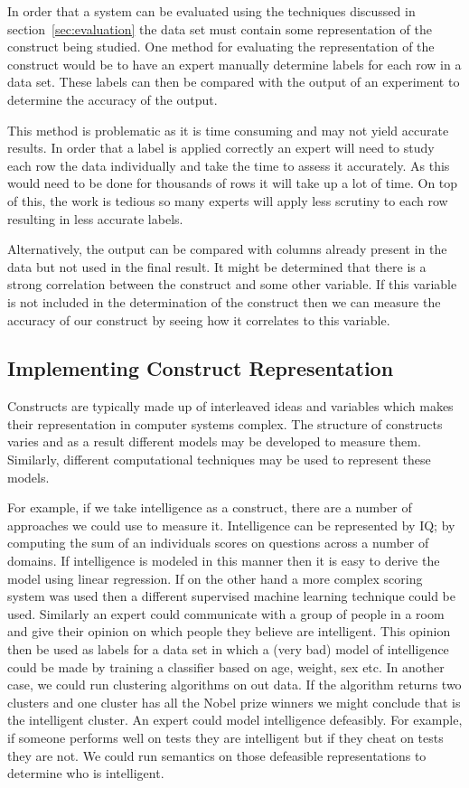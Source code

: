 In order that a system can be evaluated using the techniques discussed in  section~\ref{sec:evaluation} the data set must contain some representation of the construct being studied. One method for evaluating the representation of the construct would be to have an expert manually determine labels for each row in a data set. These labels can then be compared with the output of an experiment to determine the accuracy of the output. 

This method is problematic as it is time consuming and may not yield accurate results. In order that a label is applied correctly an expert will need to study each row the data individually and take the time to assess it accurately. As this would need to be done for thousands of rows it will take up a lot of time. On top of this, the work is tedious so many experts will apply less scrutiny to each row resulting in less accurate labels.

Alternatively, the output can be compared with columns already present in the data but not used in the final result. It might be determined that there is a strong correlation between the construct and some other variable. If this variable is not included in the determination of the construct then we can measure the accuracy of our construct by seeing how it correlates to this variable.

\subsection{Implementing Construct Representation}

Constructs are typically made up of interleaved ideas and variables which makes their representation in computer systems complex. The structure of constructs varies and as a result different models may be developed to measure them. Similarly, different computational techniques may be used to represent these models.

For example, if we take intelligence as a construct, there are a number of approaches we could use to measure it. Intelligence can be represented by IQ; by computing the sum of an individuals scores on questions across a number of domains. If intelligence is modeled in this manner then it is easy to derive the model using linear regression. If on the other hand a more complex scoring system was used then a different supervised machine learning technique could be used. Similarly an expert could communicate with a group of people in a room and give their opinion on which people they believe are intelligent. This opinion then be used as labels for a data set in which a (very bad) model of intelligence could be made by training a classifier based on age, weight, sex etc. In another case, we could run clustering algorithms on out data. If the algorithm returns two clusters and one cluster has all the Nobel prize winners we might conclude that is the intelligent cluster. An expert could model intelligence defeasibly. For example, if someone performs well on tests they are intelligent but if they cheat on tests they are not. We could run semantics on those defeasible representations to determine who is intelligent.

